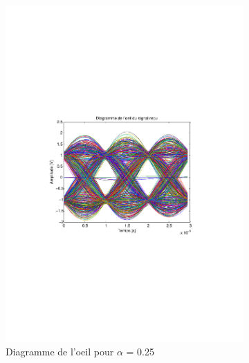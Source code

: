 \documentclass[a4paper,11pt]{article}
\begin{document}
\begin{figure}
	\begin{subfigure}{.5\textwidth}
  		\centering
  		\includegraphics[width=1\linewidth]{Q10-alfa025.pdf}
  		\caption{Diagramme de l'oeil pour $\alpha$ = 0.25}
  		\label{fig:q10a025}
	\end{subfigure}
	\begin{subfigure}{.5\textwidth}
  		\centering

\end{subfigure}
\end{figure}
\end{document}
